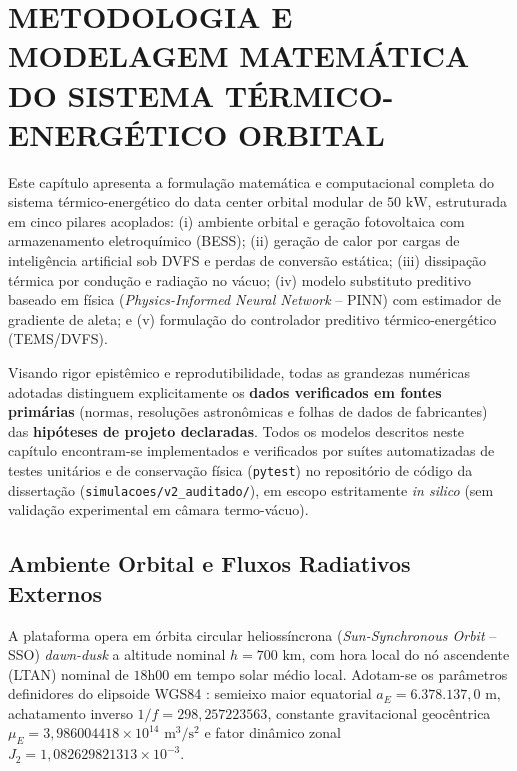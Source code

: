 \newpage
\section{METODOLOGIA E MODELAGEM MATEMÁTICA DO SISTEMA TÉRMICO-ENERGÉTICO ORBITAL}
\label{cap:modelagem}

Este capítulo apresenta a formulação matemática e computacional completa do sistema térmico-energético do data center orbital modular de $50\text{ kW}$, estruturada em cinco pilares acoplados: (i) ambiente orbital e geração fotovoltaica com armazenamento eletroquímico (BESS); (ii) geração de calor por cargas de inteligência artificial sob DVFS e perdas de conversão estática; (iii) dissipação térmica por condução e radiação no vácuo; (iv) modelo substituto preditivo baseado em física (\textit{Physics-Informed Neural Network} -- PINN) com estimador de gradiente de aleta; e (v) formulação do controlador preditivo térmico-energético (TEMS/DVFS).

Visando rigor epistêmico e reprodutibilidade, todas as grandezas numéricas adotadas distinguem explicitamente os \textbf{dados verificados em fontes primárias} (normas, resoluções astronômicas e folhas de dados de fabricantes) das \textbf{hipóteses de projeto declaradas}. Todos os modelos descritos neste capítulo encontram-se implementados e verificados por suítes automatizadas de testes unitários e de conservação física (\texttt{pytest}) no repositório de código da dissertação (\texttt{simulacoes/v2\_auditado/}), em escopo estritamente \textit{in silico} (sem validação experimental em câmara termo-vácuo).

\subsection{Ambiente Orbital e Fluxos Radiativos Externos}
\label{sec:modelo_orbital}

A plataforma opera em órbita circular heliossíncrona (\textit{Sun-Synchronous Orbit} -- SSO) \textit{dawn-dusk} a altitude nominal $h = 700\text{ km}$, com hora local do nó ascendente (LTAN) nominal de $18\text{h}00$ em tempo solar médio local. Adotam-se os parâmetros definidores do elipsoide WGS84 \cite{nga2014wgs84}: semieixo maior equatorial $a_E = 6.378.137{,}0\text{ m}$, achatamento inverso $1/f = 298{,}257223563$, constante gravitacional geocêntrica $\mu_E = 3{,}986004418 \times 10^{14}\text{ m}^3/\text{s}^2$ e fator dinâmico zonal $J_2 = 1{,}082629821313 \times 10^{-3}$.


